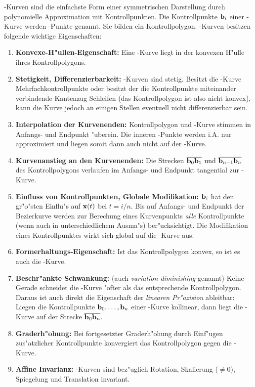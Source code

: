 \bez-Kurven sind die einfachste Form einer symmetrischen Darstellung 
durch polynomielle Approximation mit Kontrollpunkten. Die 
Kontrollpunkte ${\bf b}_i$ einer \bez-Kurve werden \bez-Punkte genannt. 
Sie bilden ein Kontrollpolygon.
\bez-Kurven besitzen folgende wichtige Eigenschaften: \label{bez_props}
\begin{enumerate}
\newcommand\nritem[2]{\item \textbf{#1:} \label{#2}}
\nritem{Konvexe-H"ullen-Eigenschaft}{bez_prop_convex_hull}
    Eine \bez-Kurve liegt in der konvexen H"ulle ihres Kontrollpolygons.
\nritem{Stetigkeit, Differenzierbarkeit}{bez_prop_diff}
    \bez-Kurven sind stetig. Besitzt die \bez-Kurve Mehrfachkontrollpunkte 
    oder besitzt der die Kontrollpunkte miteinander verbindende Kantenzug 
    Schleifen (das Kontrollpolygon ist also nicht konvex), kann die Kurve 
    jedoch an einigen Stellen eventuell nicht differenzierbar sein.
\nritem{Interpolation der Kurvenenden}{bez_prop_intpol_kurvend}
    Kontrollpolygon und \bez-Kurve stimmen in Anfangs- und Endpunkt 
    "uberein. Die inneren \bez-Punkte werden i.A. nur approximiert und 
    liegen somit dann auch nicht auf der \bez-Kurve.
\nritem{Kurvenanstieg an den Kurvenenden}{bez_prop_diff_kuvend}
    Die Strecken $\overline{{\bf b}_0{\bf b}_1}$ und 
    $\overline{{\bf b}_{n-1}{\bf b}_n}$ des Kontrollpolygons verlaufen im 
    Anfangs- und Endpunkt tangential zur \bez-Kurve.
\nritem{Einfluss von Kontrollpunkten, Globale Modifikation}{bez_prop_cp_einfl}
    ${\bf b}_i$ hat den gr"o"sten Einflu"s auf ${\bf x}(t)$ bei $t = i/n$. 
    Bis auf Anfangs- und Endpunkt der Bezierkurve werden zur Berechung 
    eines Kurvenpunkts \emph{alle} Kontrollpunkte (wenn auch in 
    unterschiedlichem Ausma"s) ber"ucksichtigt.
    Die Modifikation eines Kontrollpunktes wirkt sich global auf die
    \bez-Kurve aus.
\nritem{Formerhaltungs-Eigenschaft}{bez_prop_formerh}
    Ist das Kontrollpolygon konvex, so ist es auch die \bez-Kurve.
\nritem{Beschr"ankte Schwankung}{bez_prop_beschr_schw}(auch \emph{variation
    diminishing} genannt)
    Keine Gerade schneidet die \bez-Kurve "ofter als das entsprechende 
    Kontrollpolygon.
    Daraus ist auch direkt die Eigenschaft der \emph{linearen Pr"azision} 
    ableitbar: Liegen die Kontrollpunkte ${ \bf b}_0, \dots, { \bf b}_n$ einer 
    \bez-Kurve kollinear, dann liegt die \bez-Kurve auf der Strecke 
    $\overline{{\bf b}_0{\bf b}_n}$.
\nritem{Graderh"ohung}{bez_prop_grad_incr}
    Bei fortgesetzter Graderh"ohung durch Einf"ugen zus"atzlicher 
    Kontrollpunkte konvergiert das Kontrollpolygon gegen die \bez-Kurve.
\nritem{Affine Invarianz}{bez_prop_aff_inv}
    \bez-Kurven sind bez"uglich Rotation, Skalierung ($\not= 0$), Spiegelung 
    und Translation invariant.
\end{enumerate}

